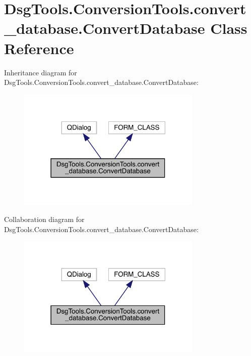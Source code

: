 \hypertarget{class_dsg_tools_1_1_conversion_tools_1_1convert__database_1_1_convert_database}{}\section{Dsg\+Tools.\+Conversion\+Tools.\+convert\+\_\+database.\+Convert\+Database Class Reference}
\label{class_dsg_tools_1_1_conversion_tools_1_1convert__database_1_1_convert_database}


Inheritance diagram for Dsg\+Tools.\+Conversion\+Tools.\+convert\+\_\+database.\+Convert\+Database\+:
\nopagebreak
\begin{figure}[H]
\begin{center}
\leavevmode
\includegraphics[width=250pt]{class_dsg_tools_1_1_conversion_tools_1_1convert__database_1_1_convert_database__inherit__graph}
\end{center}
\end{figure}


Collaboration diagram for Dsg\+Tools.\+Conversion\+Tools.\+convert\+\_\+database.\+Convert\+Database\+:
\nopagebreak
\begin{figure}[H]
\begin{center}
\leavevmode
\includegraphics[width=250pt]{class_dsg_tools_1_1_conversion_tools_1_1convert__database_1_1_convert_database__coll__graph}
\end{center}
\end{figure}
